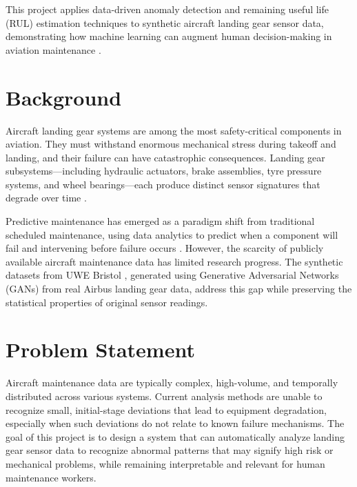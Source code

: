 \documentclass{CLS_zhou430}
\begin{document}
This project applies data-driven anomaly detection and remaining useful life (RUL) estimation techniques to synthetic aircraft landing gear sensor data, demonstrating how machine learning can augment human decision-making in aviation maintenance \cite{ran2019survey}.

\section{Background}
Aircraft landing gear systems are among the most safety-critical components in aviation. They must withstand enormous mechanical stress during takeoff and landing, and their failure can have catastrophic consequences. Landing gear subsystems---including hydraulic actuators, brake assemblies, tyre pressure systems, and wheel bearings---each produce distinct sensor signatures that degrade over time \cite{do2004proactive}.

Predictive maintenance has emerged as a paradigm shift from traditional scheduled maintenance, using data analytics to predict when a component will fail and intervening before failure occurs \cite{compare2020challenges}. However, the scarcity of publicly available aircraft maintenance data has limited research progress. The synthetic datasets from UWE Bristol \cite{uwe2023landing}, generated using Generative Adversarial Networks (GANs) \cite{goodfellow2014generative} from real Airbus landing gear data, address this gap while preserving the statistical properties of original sensor readings.

\section{Problem Statement}
Aircraft maintenance data are typically complex, high-volume, and temporally distributed across various systems. Current analysis methods are unable to recognize small, initial-stage deviations that lead to equipment degradation, especially when such deviations do not relate to known failure mechanisms. The goal of this project is to design a system that can automatically analyze landing gear sensor data to recognize abnormal patterns that may signify high risk or mechanical problems, while remaining interpretable and relevant for human maintenance workers.
\end{document}
